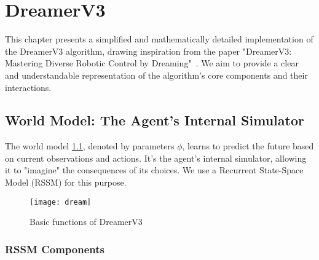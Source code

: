 \chapter{DreamerV3}

This chapter presents a simplified and mathematically detailed implementation of the DreamerV3 algorithm, drawing inspiration from the paper "DreamerV3: Mastering Diverse Robotic Control by Dreaming"~\cite{ebert2023dreamerv3}.  We aim to provide a clear and understandable representation of the algorithm's core components and their interactions.

\section{World Model: The Agent's Internal Simulator}

The world model \ref{fig:dream}, denoted by parameters $\phi$, learns to predict the future based on current observations and actions. It's the agent's internal simulator, allowing it to "imagine" the consequences of its choices.  We use a Recurrent State-Space Model (RSSM) for this purpose.

\begin{figure}
    \centering
    \texttt{[image: dream]}
    \caption{Basic functions of DreamerV3}
    \label{fig:dream}
\end{figure}

\subsection{RSSM Components}

